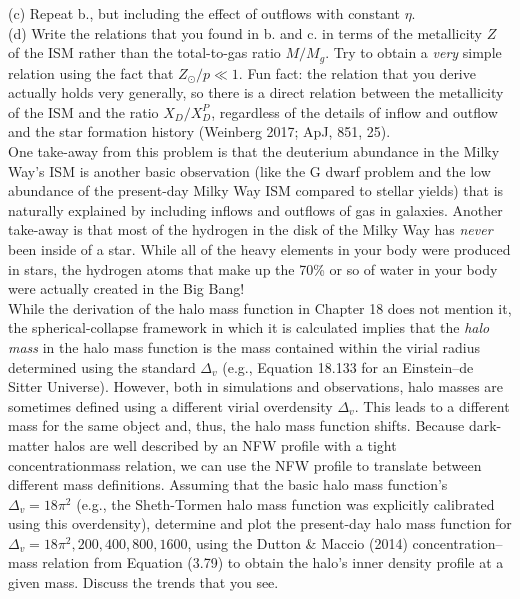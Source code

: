 \documentclass[12pt]{article}
\begin{document}
(c) Repeat b., but including the effect of outflows with constant \(\eta\).\\

(d) Write the relations that you found in b. and c. in terms of the metallicity \(Z\) 
of the ISM rather than the total-to-gas ratio \(M/M_g\). Try to obtain a \emph{very} 
simple relation using the fact that \(Z_\odot/p \ll 1\). Fun fact: the relation that you 
derive actually holds very generally, so there is a direct relation between the 
metallicity of the ISM and the ratio \(X_D/X_D^P\), regardless of the details of 
inflow and outflow and the star formation history (Weinberg 2017; ApJ, 851, 25).\\

One take-away from this problem is that the deuterium abundance in the Milky Way's ISM 
is another basic observation (like the G dwarf problem and the low abundance of the 
present-day Milky Way ISM compared to stellar yields) that is naturally explained by 
including inflows and outflows of gas in galaxies. Another take-away is that most of the 
hydrogen in the disk of the Milky Way has \emph{never} been inside of a star. While all 
of the heavy elements in your body were produced in stars, the hydrogen atoms that make 
up the 70\% or so of water in your body were actually created in the Big Bang!\\

 While the derivation of the halo mass function in Chapter 18 
does not mention it, the spherical-collapse framework in which it 
is calculated implies that the \emph{halo mass} in the halo mass function is the mass 
contained within the virial radius determined using the standard \(\Delta_v\) 
(e.g., Equation 18.133 for an Einstein--de Sitter Universe). However, both in 
simulations and observations, halo masses are sometimes defined using a different virial 
overdensity \(\Delta_v\). This leads to a different mass for the same object and, thus,
the halo mass function shifts. Because dark-matter halos are well 
described by an NFW profile with a tight concentration\textendash{}mass relation, we can 
use the NFW profile to translate between different mass definitions. Assuming that the 
basic halo mass function's \(\Delta_v = 18\pi^2\) (e.g., the Sheth-Tormen halo mass 
function was explicitly calibrated using this overdensity), determine and plot the 
present-day halo mass function for \(\Delta_v = 18\pi^2, 200, 400, 800, 1600\), using 
the Dutton \& Maccio (2014) concentration--mass relation from Equation (3.79) to obtain 
the halo's inner density profile at a given mass. Discuss the trends that you see.
\end{document}
